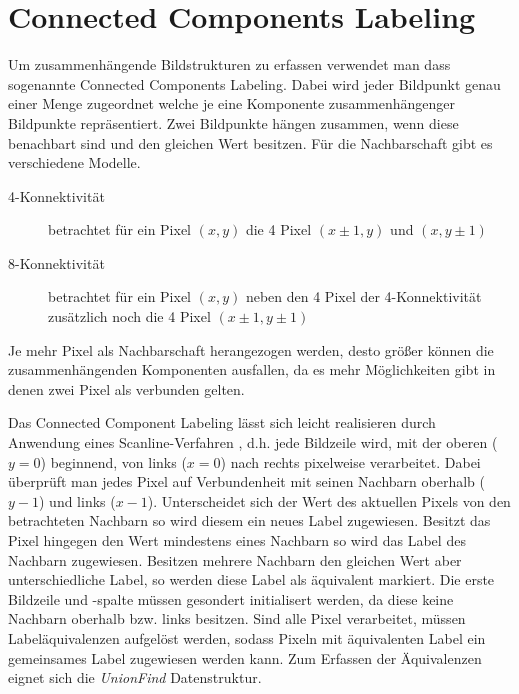 \section{Connected Components Labeling}
\writtenby{\dcauthornameewie}%
Um zusammenhängende Bildstrukturen zu erfassen verwendet man dass sogenannte Connected Components Labeling.
Dabei wird jeder Bildpunkt genau einer Menge zugeordnet welche je eine Komponente zusammenhängenger Bildpunkte repräsentiert.
Zwei Bildpunkte hängen zusammen, wenn diese benachbart sind und den gleichen Wert besitzen.
Für die Nachbarschaft gibt es verschiedene Modelle.

\begin{description}
\item[4-Konnektivität] betrachtet für ein Pixel $(x,y)$ die 4 Pixel $(x\pm1,y)$ und $(x,y\pm1)$
\item[8-Konnektivität] betrachtet für ein Pixel $(x,y)$ neben den 4 Pixel der 4-Konnektivität zusätzlich noch die 4 Pixel $(x\pm1,y\pm1)$
\end{description}
Je mehr Pixel als Nachbarschaft herangezogen werden, desto größer können die zusammenhängenden Komponenten ausfallen, da es mehr Möglichkeiten gibt in denen zwei Pixel als verbunden gelten.

Das Connected Component Labeling lässt sich leicht realisieren durch Anwendung eines Scanline-Verfahren \cite[69--75]{compvis2001}, d.h. jede Bildzeile wird, mit der oberen ($y=0$) beginnend, von links ($x=0$) nach rechts pixelweise verarbeitet.
Dabei überprüft man jedes Pixel auf Verbundenheit mit seinen Nachbarn oberhalb ($y-1$) und links ($x-1$).
Unterscheidet sich der Wert des aktuellen Pixels von den betrachteten Nachbarn so wird diesem ein neues Label zugewiesen.
Besitzt das Pixel hingegen den Wert mindestens eines Nachbarn so wird das Label des Nachbarn zugewiesen.
Besitzen mehrere Nachbarn den gleichen Wert aber unterschiedliche Label, so werden diese Label als äquivalent markiert.
Die erste Bildzeile und -spalte müssen gesondert initialisert werden, da diese keine Nachbarn oberhalb bzw. links besitzen.
Sind alle Pixel verarbeitet, müssen Labeläquivalenzen aufgelöst werden, sodass Pixeln mit äquivalenten Label ein gemeinsames Label zugewiesen werden kann. Zum Erfassen der Äquivalenzen eignet sich die \emph{UnionFind} Datenstruktur.
